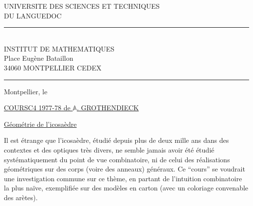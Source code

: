 \noindent\begin{minipage}[t]{0.57\linewidth}
\centering\sffamily
UNIVERSITE DES SCIENCES ET TECHNIQUES\\
DU LANGUEDOC\\
\rule{0.55cm}{0.4pt}\\
INSTITUT DE MATHEMATIQUES\\
Place Eugène Bataillon\\
34060 MONTPELLIER CEDEX\\
\rule{0.65cm}{0.4pt}
\end{minipage}\hfill
\begin{minipage}[t]{0.37\linewidth}
Montpellier, le
\end{minipage}

\begin{center}
\setlength{\ULdepth}{1.45\baselineskip}
\uline{COURS\quad C4 1977-78 de $\mathbb A$. GROTHENDIECK}\par\vspace{.6\baselineskip}
\end{center}

\uline{Géométrie de l'icosaèdre}

Il est étrange que l'icosaèdre, étudié depuis plus de deux mille ans dans des contextes et des optiques très divers, ne semble jamais avoir été étudié systématiquement du point de vue combinatoire, ni de celui des réalisations géométriques sur des corps (voire des anneaux) généraux. Ce ``cours'' se voudrait une investigation commune sur ce thème, en partant de l'intuition combinatoire la plus naïve, exemplifiée sur des modèles en carton (avec un coloriage convenable des arètes).

